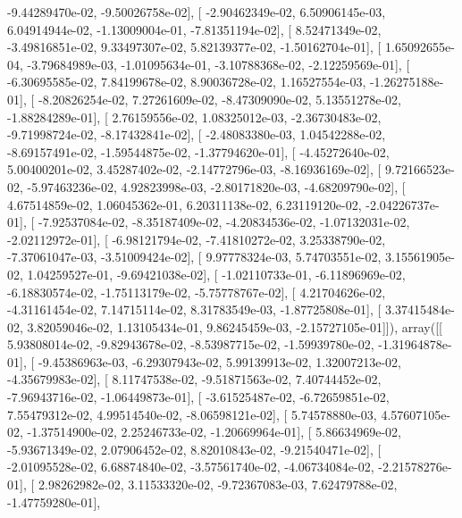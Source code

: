 \documentclass{article}
\begin{document}
         -9.44289470e-02,  -9.50026758e-02],
       [ -2.90462349e-02,   6.50906145e-03,   6.04914944e-02,
         -1.13009004e-01,  -7.81351194e-02],
       [  8.52471349e-02,  -3.49816851e-02,   9.33497307e-02,
          5.82139377e-02,  -1.50162704e-01],
       [  1.65092655e-04,  -3.79684989e-03,  -1.01095634e-01,
         -3.10788368e-02,  -2.12259569e-01],
       [ -6.30695585e-02,   7.84199678e-02,   8.90036728e-02,
          1.16527554e-03,  -1.26275188e-01],
       [ -8.20826254e-02,   7.27261609e-02,  -8.47309090e-02,
          5.13551278e-02,  -1.88284289e-01],
       [  2.76159556e-02,   1.08325012e-03,  -2.36730483e-02,
         -9.71998724e-02,  -8.17432841e-02],
       [ -2.48083380e-03,   1.04542288e-02,  -8.69157491e-02,
         -1.59544875e-02,  -1.37794620e-01],
       [ -4.45272640e-02,   5.00400201e-02,   3.45287402e-02,
         -2.14772796e-03,  -8.16936169e-02],
       [  9.72166523e-02,  -5.97463236e-02,   4.92823998e-03,
         -2.80171820e-03,  -4.68209790e-02],
       [  4.67514859e-02,   1.06045362e-01,   6.20311138e-02,
          6.23119120e-02,  -2.04226737e-01],
       [ -7.92537084e-02,  -8.35187409e-02,  -4.20834536e-02,
         -1.07132031e-02,  -2.02112972e-01],
       [ -6.98121794e-02,  -7.41810272e-02,   3.25338790e-02,
         -7.37061047e-03,  -3.51009424e-02],
       [  9.97778324e-03,   5.74703551e-02,   3.15561905e-02,
          1.04259527e-01,  -9.69421038e-02],
       [ -1.02110733e-01,  -6.11896969e-02,  -6.18830574e-02,
         -1.75113179e-02,  -5.75778767e-02],
       [  4.21704626e-02,  -4.31161454e-02,   7.14715114e-02,
          8.31783549e-03,  -1.87725808e-01],
       [  3.37415484e-02,   3.82059046e-02,   1.13105434e-01,
          9.86245459e-03,  -2.15727105e-01]]), array([[  5.93808014e-02,  -9.82943678e-02,  -8.53987715e-02,
         -1.59939780e-02,  -1.31964878e-01],
       [ -9.45386963e-03,  -6.29307943e-02,   5.99139913e-02,
          1.32007213e-02,  -4.35679983e-02],
       [  8.11747538e-02,  -9.51871563e-02,   7.40744452e-02,
         -7.96943716e-02,  -1.06449873e-01],
       [ -3.61525487e-02,  -6.72659851e-02,   7.55479312e-02,
          4.99514540e-02,  -8.06598121e-02],
       [  5.74578880e-03,   4.57607105e-02,  -1.37514900e-02,
          2.25246733e-02,  -1.20669964e-01],
       [  5.86634969e-02,  -5.93671349e-02,   2.07906452e-02,
          8.82010843e-02,  -9.21540471e-02],
       [ -2.01095528e-02,   6.68874840e-02,  -3.57561740e-02,
         -4.06734084e-02,  -2.21578276e-01],
       [  2.98262982e-02,   3.11533320e-02,  -9.72367083e-03,
          7.62479788e-02,  -1.47759280e-01],
\end{document}
